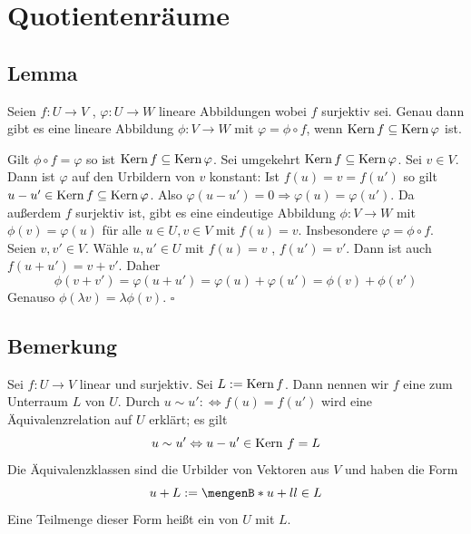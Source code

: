 \section{Quotientenräume} %
\label{sec:3}
\subsection[Lemma über die Existenz einer linearen Abbildung]{Lemma} %
\label{sub:31}
Seien $f : U \to V$ , $\varphi : U \to W$ lineare Abbildungen wobei $f$ surjektiv sei. Genau dann gibt es eine lineare Abbildung $\phi : V \to W$ mit 
$\varphi = \phi \circ f$, wenn $\operatorname{Kern} f \subseteq \operatorname{Kern} \varphi$ ist.

\begin{figure}
\end{figure}
Gilt $\phi \circ f = \varphi$ so ist $\operatorname{Kern} f \subseteq \operatorname{Kern} \varphi$. Sei umgekehrt $\operatorname{Kern} f \subseteq \operatorname{Kern} \varphi$. Sei $v \in V$. Dann ist 
$\varphi$ auf den Urbildern von $v$ konstant: Ist $f(u)= v = f(u')$ so gilt $u-u' \in \operatorname{Kern} f \subseteq \operatorname{Kern} \varphi$. Also 
$\varphi(u-u')= 0 \Rightarrow \varphi(u) = \varphi(u')$. Da außerdem $f$ surjektiv ist, gibt es eine eindeutige Abbildung $\phi : V \to W$ mit $\phi (v) = \varphi(u)$
für alle $u\in U , v \in V$ mit $f(u)=v$. Insbesondere $\varphi = \phi \circ f$.
Seien $v,v' \in V$. Wähle $u,u' \in U$ mit $f(u)= v$ , $f(u')=v'$. Dann ist auch $f(u+u')= v+v'$. Daher 
\[
	\phi (v+v') = \varphi (u+u') = \varphi(u) + \varphi(u') = \phi(v) + \phi(v') 
\]
Genauso $\phi(\lambda  v)= \lambda \phi (v)$. \hfill \( \square \)

\subsection[Bemerkung über die Quotientenabbildung]{Bemerkung} %
\label{sub:32}
Sei $f: U \to V$ linear und surjektiv. Sei $L := \operatorname{Kern} f$. Dann nennen wir $f$ eine  zum Unterraum $L$ von $U
$. Durch 
$u \sim u' :\Leftrightarrow f(u) = f(u')$ wird eine Äquivalenzrelation auf $U$ erklärt; es gilt 
\[
	u \sim u' \Leftrightarrow u-u' \in \operatorname{Kern} \, f = L
\] 
Die Äquivalenzklassen sind die Urbilder von Vektoren aus $V$ und haben die Form 
\[
	u+ L := \set[u+l]{l \in L}
\] 
Eine Teilmenge dieser Form heißt ein  von $U$ mit  $L$.   

